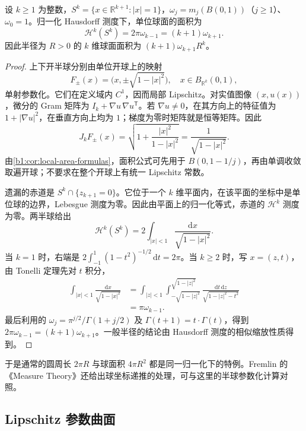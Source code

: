 \begin{proposition}\label{b1:prop:sphere-hausdorff-area}
设 \(k\ge1\) 为整数，\(S^k=\{x\in\mathbb R^{k+1}:|x|=1\}\)，\(\omega_j=m_j(B(0,1))\)（\(j\ge1\)）、\(\omega_0=1\)。归一化 Hausdorff 测度下，单位球面的面积为
\[
 \mathcal H^k(S^k)=2\pi\omega_{k-1}=(k+1)\omega_{k+1}.
\]
因此半径为 \(R>0\) 的 \(k\) 维球面面积为 \((k+1)\omega_{k+1}R^k\)。
\end{proposition}
\begin{proof}
上下开半球分别由单位开球上的映射
\[
 F_\pm(x)=\bigl(x,\pm\sqrt{1-|x|^2}\bigr),
 \quad x\in B_{\mathbb R^k}(0,1),
\]
单射参数化。它们在定义域内 \(C^1\)，因而局部 Lipschitz。对实值图像 \((x,u(x))\)，微分的 Gram 矩阵为 \(I_k+\nabla u\,\nabla u^{\mathsf T}\)。若 \(\nabla u\ne0\)，在其方向上的特征值为 \(1+|\nabla u|^2\)，在垂直方向上均为 \(1\)；梯度为零时矩阵就是恒等矩阵。因此
\[
 J_kF_\pm(x)=\sqrt{1+\frac{|x|^2}{1-|x|^2}}
            =\frac1{\sqrt{1-|x|^2}}.
\]
由\cref{b1:cor:local-area-formulas}，面积公式可先用于 \(B(0,1-1/j)\)，再由单调收敛取遍开球；不要求在整个开球上有统一 Lipschitz 常数。

遗漏的赤道是 \(S^k\cap\{z_{k+1}=0\}\)。它位于一个 \(k\) 维平面内，在该平面的坐标中是单位球的边界，Lebesgue 测度为零。因此由平面上的归一化等式，赤道的 \(\mathcal H^k\) 测度为零。两半球给出
\[
 \mathcal H^k(S^k)=2\int_{|x|<1}\frac{\mathrm dx}{\sqrt{1-|x|^2}}.
\]
当 \(k=1\) 时，右端是 \(2\int_{-1}^1(1-t^2)^{-1/2}\,\mathrm dt=2\pi\)。当 \(k\geq2\) 时，写 \(x=(z,t)\)，由 Tonelli 定理先对 \(t\) 积分，
\[
 \begin{aligned}
 \int_{|x|<1}\frac{\mathrm dx}{\sqrt{1-|x|^2}}
 &=\int_{|z|<1}
   \int_{-\sqrt{1-|z|^2}}^{\sqrt{1-|z|^2}}
       \frac{\mathrm dt\,\mathrm dz}{\sqrt{1-|z|^2-t^2}}\\
 &=\pi\omega_{k-1}.
 \end{aligned}
\]
最后利用的 \(\omega_j=\pi^{j/2}/\Gamma(1+j/2)\) 及 \(\Gamma(t+1)=t\cdot \Gamma(t)\)，得到 \(2\pi\omega_{k-1}=(k+1)\omega_{k+1}\)。一般半径的结论由 Hausdorff 测度的相似缩放性质得到。
\end{proof}

于是通常的圆周长 \(2\pi R\) 与球面积 \(4\pi R^2\) 都是同一归一化下的特例。Fremlin 的《Measure Theory》\cite[265F--H]{Fremlin2016Measure}还给出球坐标递推的处理，可与这里的半球参数化计算对照。

\subsection{Lipschitz 参数曲面}
\label{b1:subsec:170403}

